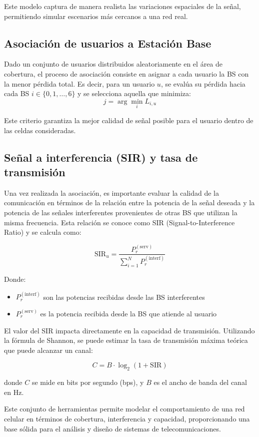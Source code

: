 Este modelo captura de manera realista las variaciones espaciales de la señal, permitiendo simular escenarios más cercanos a una red real.

\subsection*{Asociación de usuarios a Estación Base}

Dado un conjunto de usuarios distribuidos aleatoriamente en el área de cobertura, el proceso de asociación consiste en asignar a cada usuario la BS con la menor pérdida total. Es decir, para un usuario \( u \), se evalúa su pérdida hacia cada BS \( i \in \{0, 1, \dots, 6\} \) y se selecciona aquella que minimiza:  
\[
j = \arg\min_{i} L_{i,u}
\]

Este criterio garantiza la mejor calidad de señal posible para el usuario dentro de las celdas consideradas.

\subsection*{Señal a interferencia (SIR) y tasa de transmisión}
Una vez realizada la asociación, es importante evaluar la calidad de la comunicación en términos de la relación entre la potencia de la señal deseada y la potencia de las señales interferentes provenientes de otras BS que utilizan la misma frecuencia. Esta relación se conoce como SIR (Signal-to-Interference Ratio) y se calcula como:

\[
\text{SIR}_u = \frac{P_r^{(\text{serv})}}{\sum_{i=1}^{N} P_r^{(\text{interf})}}
\]

Donde: 
\begin{itemize}
    \item $P_r^{(\text{interf})}$ son las potencias recibidas desde las BS interferentes
    \item $P_r^{(\text{serv})}$ es la potencia recibida desde la BS que atiende al usuario
\end{itemize}

El valor del SIR impacta directamente en la capacidad de transmisión. Utilizando la fórmula de Shannon, se puede estimar la tasa de transmisión máxima teórica que puede alcanzar un canal:

\[
C = B \cdot \log_2(1 + \text{SIR})
\]

donde \( C \) se mide en bits por segundo (bps), y \( B \) es el ancho de banda del canal en Hz.

Este conjunto de herramientas permite modelar el comportamiento de una red celular en términos de cobertura, interferencia y capacidad, proporcionando una base sólida para el análisis y diseño de sistemas de telecomunicaciones.